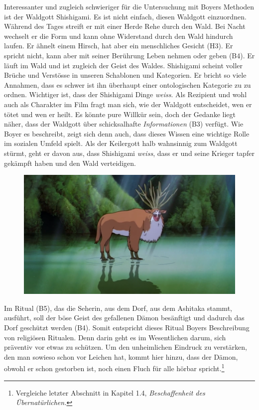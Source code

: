 Interessanter und zugleich schwieriger für die Untersuchung mit Boyers Methoden ist der Waldgott Shishigami. Es ist nicht einfach, diesen Waldgott einzuordnen. Während des Tages streift er mit einer Herde Rehe durch den Wald. Bei Nacht wechselt er die Form und kann ohne Widerstand durch den Wald hindurch laufen. Er ähnelt einem Hirsch, hat aber ein menschliches Gesicht (H3). Er spricht nicht, kann aber mit seiner Berührung Leben nehmen oder geben (B4). Er läuft im Wald und ist zugleich der Geist des Waldes. Shishigami scheint voller Brüche und Verstösse in unseren Schablonen und Kategorien. Er bricht so viele Annahmen, dass es schwer ist ihn überhaupt einer ontologischen Kategorie zu zu ordnen. Wichtiger ist, dass der Shishigami Dinge \emph{weiss}. Als Rezipient und wohl auch als Charakter im Film fragt man sich, wie der Waldgott entscheidet, wen er tötet und wen er heilt. Es könnte pure Willkür sein, doch der Gedanke liegt näher, dass der Waldgott über schicksalhafte \emph{Informationen} (B3) verfügt. Wie Boyer es beschreibt, zeigt sich denn auch, dass dieses Wissen eine wichtige Rolle im sozialen Umfeld spielt. Als der Keilergott halb wahnsinnig zum Waldgott stürmt, geht er davon aus, dass Shishigami \emph{weiss}, dass er und seine Krieger tapfer gekämpft haben und den Wald verteidigen. 

\begin{figure}
  \centering
  \includegraphics[width=.8\linewidth]{images/01-09-38_mononoke.png}
  \label{fig:test2}
\end{figure}

Im Ritual (B5), das die Seherin, aus dem Dorf, aus dem Ashitaka stammt, ausführt, soll der böse Geist des gefallenen Dämon besänftigt und dadurch das Dorf geschützt werden (B4). Somit entspricht dieses Ritual Boyers Beschreibung von religiösen Ritualen. Denn darin geht es im Wesentlichen darum, sich präventiv vor etwas zu schützen. Um den unheimlichen Eindruck zu verstärken, den man sowieso schon vor Leichen hat, kommt hier hinzu, dass der Dämon, obwohl er schon gestorben ist, noch einen Fluch für alle hörbar spricht.\footnote{Vergleiche letzter Abschnitt in Kapitel 1.4, \emph{Beschaffenheit des Übernatürlichen.}}

